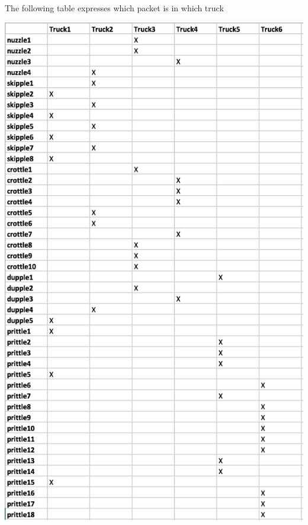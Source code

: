 \documentclass[12pt]{article}
\begin{document}
The following table expresses which packet is in which truck

\vspace{3mm}

\includegraphics[angle=0]{one.png}
\end{document}

